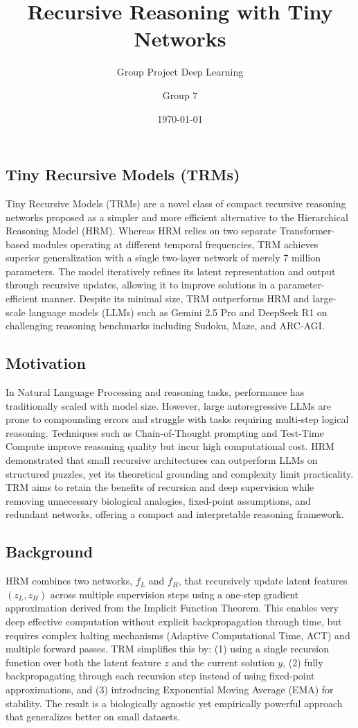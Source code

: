 \documentclass[dtu]{dtuarticle}
\title{Recursive Reasoning with Tiny Networks}
\subtitle{Group Project Deep Learning}
\author{Group 7}
\date{\today}
\begin{document}
	\maketitle

	\subsection*{Tiny Recursive Models (TRMs)}

	Tiny Recursive Models (TRMs) are a novel class of compact recursive reasoning networks proposed as a simpler and more efficient alternative to the Hierarchical Reasoning Model (HRM). Whereas HRM relies on two separate Transformer-based modules operating at different temporal frequencies, TRM achieves superior generalization with a single two-layer network of merely 7 million parameters. The model iteratively refines its latent representation and output through recursive updates, allowing it to improve solutions in a parameter-efficient manner. Despite its minimal size, TRM outperforms HRM and large-scale language models (LLMs) such as Gemini 2.5 Pro and DeepSeek R1 on challenging reasoning benchmarks including Sudoku, Maze, and ARC-AGI.

	\subsection*{Motivation}

	In Natural Language Processing and reasoning tasks, performance has traditionally scaled with model size. However, large autoregressive LLMs are prone to compounding errors and struggle with tasks requiring multi-step logical reasoning. Techniques such as Chain-of-Thought prompting and Test-Time Compute improve reasoning quality but incur high computational cost. HRM demonstrated that small recursive architectures can outperform LLMs on structured puzzles, yet its theoretical grounding and complexity limit practicality. TRM aims to retain the benefits of recursion and deep supervision while removing unnecessary biological analogies, fixed-point assumptions, and redundant networks, offering a compact and interpretable reasoning framework.

	\subsection*{Background}

	HRM combines two networks, $f_L$ and $f_H$, that recursively update latent features $(z_L, z_H)$ across multiple supervision steps using a one-step gradient approximation derived from the Implicit Function Theorem. This enables very deep effective computation without explicit backpropagation through time, but requires complex halting mechanisms (Adaptive Computational Time, ACT) and multiple forward passes. TRM simplifies this by: (1) using a single recursion function over both the latent feature $z$ and the current solution $y$, (2) fully backpropagating through each recursion step instead of using fixed-point approximations, and (3) introducing Exponential Moving Average (EMA) for stability. The result is a biologically agnostic yet empirically powerful approach that generalizes better on small datasets.
\end{document}
